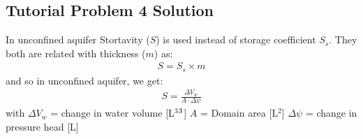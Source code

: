 \documentclass[letterpaper,10pt,english]{sphinxmanual}
\begin{document}
\subsection{Tutorial Problem 4 \textendash{} Solution}
\label{\detokenize{contents/tutorials/tutorial_02/tutorial_02:tutorial-problem-4-solution}}

In unconfined aquifer Stortavity (\(S\)) is used instead of storage coefficient \(S_s\). They both are related with thickness (\(m\)) as:
\begin{equation*}
\begin{split}
S = S_s \times m
\end{split}
\end{equation*}
and so in unconfined aquifer, we get:
\begin{equation*}
\begin{split}S = \frac{\Delta V_w}{A \cdot \Delta \psi } \end{split}
\end{equation*}
with 
\(\Delta V_w\) = change in water volume {[}L\(^3\)\(\sp{\text{3}}\){]} 
\(A\) = Domain area {[}L\(^2\){]}
\(\Delta \psi\) = change in pressure head {[}L{]}
\end{document}
